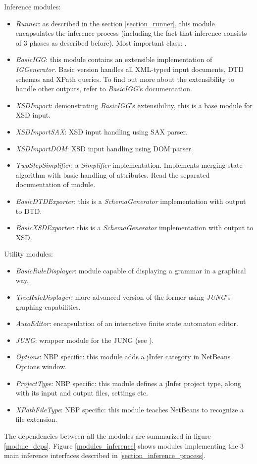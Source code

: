 \documentclass[a4paper,10pt,oneside]{article}
\newcommand{\code}[1]{\texttt{\StrSubstitute{#1}{.}{.\.}}}
\def\.{\discretionary{}{}{}}
\newcommand{\jmodule}[1]{\emph{#1}}
\begin{document}
\noindent Inference modules:
\begin{itemize}
	\item \jmodule{Runner}: as described in the section \ref{section_runner}, this module encapsulates the inference process (including the fact that inference consists of 3 phases as described before). Most important class: \code{Runner}.
	\item \jmodule{BasicIGG}: this module contains an extensible implementation of \jmodule{IGGenerator}. Basic version handles all XML-typed input documents, DTD schemas and XPath queries. To find out more about the extensibility to handle other outputs, refer to \jmodule{BasicIGG}'s documentation.
	\item \jmodule{XSDImport}: demonstrating \jmodule{BasicIGG}'s extensibility, this is a base module for XSD input.
	\item \jmodule{XSDImportSAX}: XSD input handling using SAX parser.
	\item \jmodule{XSDImportDOM}: XSD input handling using DOM parser.
	\item \jmodule{TwoStepSimplifier}: a \jmodule{Simplifier} implementation. Implements \cite{ahonen} merging state algorithm with basic handling of attributes. Read the separated documentation of module.
	\item \jmodule{BasicDTDExporter}: this is a \jmodule{SchemaGenerator} implementation with output to DTD.
	\item \jmodule{BasicXSDExporter}: this is a \jmodule{SchemaGenerator} implementation with output to XSD.
\end{itemize}

\noindent Utility modules:
\begin{itemize}
	\item \jmodule{BasicRuleDisplayer}: module capable of displaying a grammar in a graphical way.
	\item \jmodule{TreeRuleDisplayer}: more advanced version of the former using \jmodule{JUNG}'s graphing capabilities.
	\item \jmodule{AutoEditor}: encapsulation of an interactive finite state automaton editor.
	\item \jmodule{JUNG}: wrapper module for the JUNG (see \cite{jung}).
	\item \jmodule{Options}: NBP specific: this module adds a jInfer category in NetBeans Options window.
	\item \jmodule{ProjectType}: NBP specific: this module defines a jInfer project type, along with its input and output files, settings etc.
	\item \jmodule{XPathFileType}: NBP specific: this module teaches NetBeans to recognize a \code{.xpath} file extension.
\end{itemize}
The dependencies between all the modules are summarized in figure \ref{module_deps}. Figure \ref{modules_inference} shows modules implementing the 3 main inference interfaces described in \ref{section_inference_process}.
\end{document}
